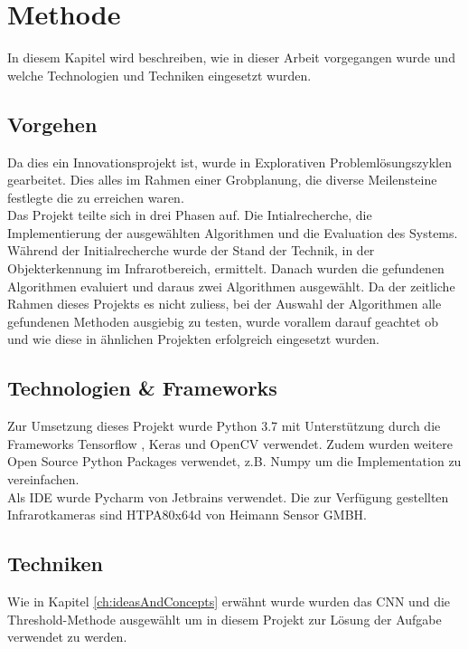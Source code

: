\chapter{Methode}

In diesem Kapitel wird beschreiben, wie in dieser Arbeit vorgegangen wurde und welche Technologien und Techniken eingesetzt wurden.


\section{Vorgehen}

Da dies ein Innovationsprojekt ist, wurde in Explorativen Problemlösungszyklen gearbeitet. Dies alles im Rahmen einer Grobplanung, die diverse Meilensteine festlegte die zu erreichen waren.\\
Das Projekt teilte sich in drei Phasen auf.  Die Intialrecherche, die Implementierung der ausgewählten Algorithmen und die Evaluation des Systems.\\
Während der Initialrecherche wurde der Stand der Technik, in der Objekterkennung im Infrarotbereich, ermittelt. Danach wurden die gefundenen Algorithmen evaluiert und daraus zwei Algorithmen ausgewählt. Da der zeitliche Rahmen dieses Projekts es nicht zuliess, bei der Auswahl der Algorithmen alle gefundenen Methoden ausgiebig zu testen, wurde vorallem darauf geachtet ob und wie diese in ähnlichen Projekten erfolgreich eingesetzt wurden.

\section{Technologien \& Frameworks}
Zur Umsetzung dieses Projekt wurde Python 3.7 mit Unterstützung durch die Frameworks Tensorflow \parencite{tensorflow2015}, Keras \parencite{keras} und OpenCV \parencite{opencv} verwendet. Zudem wurden weitere Open Source Python Packages verwendet, z.B. Numpy \parencite{numpy} um die Implementation zu vereinfachen.\\
Als \gls{IDE} wurde Pycharm von Jetbrains \parencite{pycharm} verwendet. Die zur Verfügung gestellten Infrarotkameras sind HTPA80x64d von Heimann Sensor GMBH.

\section{Techniken}

Wie in Kapitel \ref{ch:ideasAndConcepts} erwähnt wurde wurden das \gls{CNN} und die Threshold-Methode ausgewählt um in diesem Projekt zur Lösung der Aufgabe verwendet zu werden. 

